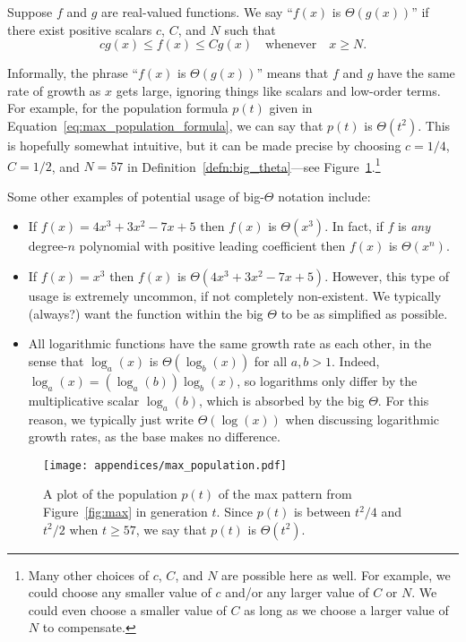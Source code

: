 \begin{definition}\label{defn:big_theta}
	Suppose $f$ and $g$ are real-valued functions. We say ``$f(x)$ is $\Theta(g(x))$'' if there exist positive scalars $c$, $C$, and $N$ such that
	\[
		cg(x) \leq f(x) \leq Cg(x) \quad \text{whenever} \quad x \geq N.
	\]
\end{definition}

Informally, the phrase ``$f(x)$ is $\Theta(g(x))$'' means that $f$ and $g$ have the same rate of growth as $x$ gets large, ignoring things like scalars and low-order terms. For example, for the population formula $p(t)$ given in Equation~\eqref{eq:max_population_formula}, we can say that $p(t)$ is $\Theta(t^2)$. This is hopefully somewhat intuitive, but it can be made precise by choosing $c = 1/4$, $C = 1/2$, and $N = 57$ in Definition~\ref{defn:big_theta}---see Figure~\ref{fig:max_population_graph}.\footnote{Many other choices of $c$, $C$, and $N$ are possible here as well. For example, we could choose any smaller value of $c$ and/or any larger value of $C$ or $N$. We could even choose a smaller value of $C$ as long as we choose a larger value of $N$ to compensate.}

Some other examples of potential usage of big-$\Theta$ notation include:\smallskip

\begin{itemize}
	\item If $f(x) = 4x^3 + 3x^2 - 7x + 5$ then $f(x)$ is $\Theta(x^3)$. In fact, if $f$ is \emph{any} degree-$n$ polynomial with positive leading coefficient then $f(x)$ is $\Theta(x^n)$.\smallskip
	
	\item If $f(x) = x^3$ then $f(x)$ is $\Theta(4x^3 + 3x^2 - 7x + 5)$. However, this type of usage is extremely uncommon, if not completely non-existent. We typically (always?) want the function within the big $\Theta$ to be as simplified as possible.\smallskip
	
	\item All logarithmic functions have the same growth rate as each other, in the sense that $\log_a(x)$ is $\Theta(\log_b(x))$ for all $a,b > 1$. Indeed, $\log_a(x) = (\log_a(b))\log_b(x)$, so logarithms only differ by the multiplicative scalar $\log_a(b)$, which is absorbed by the big $\Theta$. For this reason, we typically just write $\Theta(\log(x))$ when discussing logarithmic growth rates, as the base makes no difference.
\end{itemize}

\begin{figure}[!htb]
\centering
\texttt{[image: appendices/max\_population.pdf]}
\caption{A plot of the population $p(t)$ of the max pattern from Figure~\ref{fig:max} in generation $t$. Since $p(t)$ is between $t^2/4$ and $t^2/2$ when $t \geq 57$, we say that $p(t)$ is $\Theta(t^2)$.}\label{fig:max_population_graph}
\end{figure}
